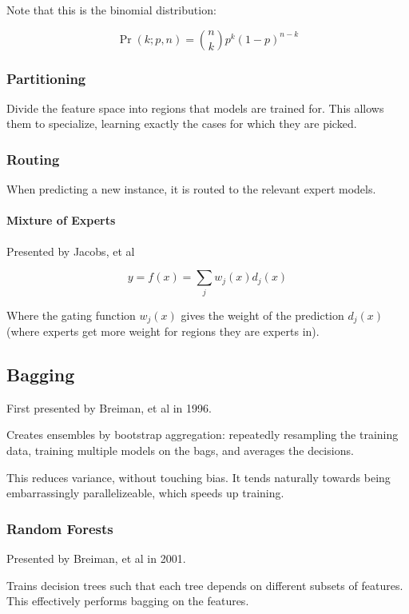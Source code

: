 \documentclass{idc_msc}
\begin{document}
Note that this is the binomial distribution:

\[\Pr(k;p,n) = \binom{n}{k}p^k (1-p)^{n-k}\]

\subsubsection{Partitioning}

Divide the feature space into regions that models are trained for.
This allows them to specialize, learning exactly the cases for which they are picked.

\subsubsection{Routing}

When predicting a new instance, it is routed to the relevant expert models.

\paragraph{Mixture of Experts}

Presented by Jacobs, et al\cite{jacobs1991adaptive}

\[y=f(x)=\sum_j w_j(x)d_j(x)\]

Where the gating function \(w_j(x)\) gives the weight of the prediction \(d_j(x)\) (where experts get more weight for regions they are experts in).

\subsection{Bagging}

First presented by Breiman, et al in 1996\cite{breiman1996bagging}.

Creates ensembles by bootstrap aggregation: repeatedly resampling the training data, training multiple models on the bags, and averages the decisions.

This reduces variance, without touching bias.
It tends naturally towards being embarrassingly parallelizeable, which speeds up training.

\subsubsection{Random Forests}

Presented by Breiman, et al in 2001\cite{breiman2001random}.

Trains decision trees such that each tree depends on different subsets of features.
This effectively performs bagging on the features.
\end{document}
